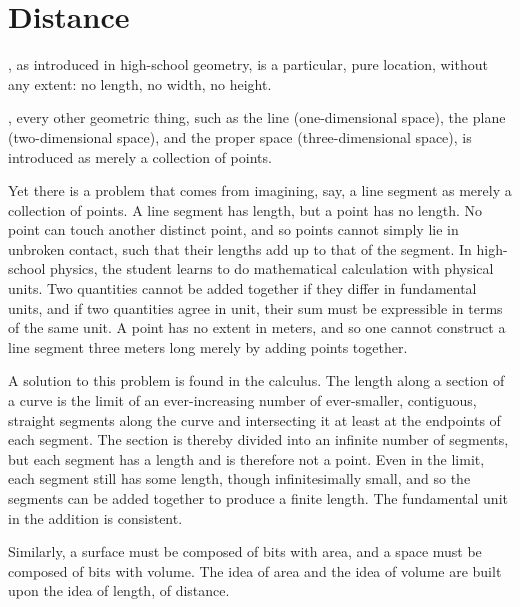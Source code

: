 \documentclass[nobib]{tufte-book}
\begin{document}


\mainmatter

\chapter{Distance}
\label{ch:distance}

, as introduced in high-school geometry, is a particular,
pure location, without any extent: no length, no width, no height.

, every other geometric thing, such as the
line (one-dimensional space), the plane (two-dimensional space), and the proper
space (three-dimensional space), is introduced as merely a collection of
points.

\bigskip
Yet there is a problem that comes from imagining, say, a line segment as merely
a collection of points.  A line segment has length, but a point has no length.
No point can touch another distinct point, and so points cannot simply lie in
unbroken contact, such that their lengths add up to that of the segment.  In
high-school physics, the student learns to do mathematical calculation with
physical units.  Two quantities cannot be added together if they differ in
fundamental units, and if two quantities agree in unit, their sum must be
expressible in terms of the same unit.
A point has no extent in meters, and so one cannot construct a line segment
three meters long merely by adding points together.

A solution to this problem is found in the calculus.  The length along a
section of a curve is the limit of an ever-increasing number of ever-smaller,
contiguous, straight segments along the curve and intersecting it at least at
the endpoints of each segment.  The section is thereby divided into an infinite
number of segments, but each segment has a length and is therefore not a point.
Even in the limit, each segment still has some length, though infinitesimally
small, and so the segments can be added together to produce a finite length.
The fundamental unit in the addition is consistent.

Similarly, a surface must be composed of bits with area, and a space must be
composed of bits with volume.  The idea of area and the idea of volume are
built upon the idea of length, of distance.
\end{document}
